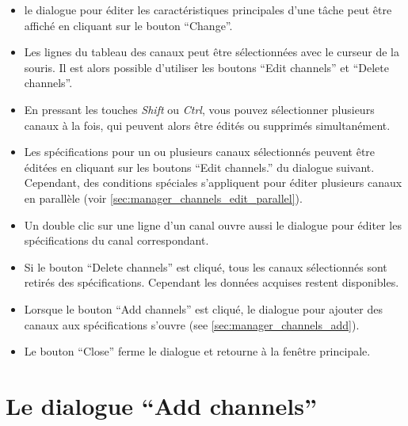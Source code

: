 \documentclass[a4paper,12pt,BCOR6mm,bibtotoc,idxtotoc]{scrbook}
\begin{document}
\begin{itemize}

\item le dialogue pour \'editer les caract\'eristiques principales d'une t\^ache
  peut \^etre affich\'e en cliquant sur le bouton ``Change''.

\item Les lignes du tableau des canaux peut \^etre s\'electionn\'ees
  avec le curseur de la souris. Il est alors possible d'utiliser les boutons
  ``Edit channels'' et ``Delete channels''.

\item En pressant les touches \textit{Shift} ou \textit{Ctrl}, vous
  pouvez s\'electionner plusieurs canaux \`a la fois, qui peuvent
  alors \^etre \'edit\'es ou supprim\'es simultan\'ement.

\item Les sp\'ecifications pour un ou plusieurs canaux
  s\'electionn\'es peuvent \^etre \'edit\'ees en cliquant sur les
  boutons ``Edit channels.''  du dialogue suivant.
  Cependant, des conditions sp\'eciales s'appliquent pour \'editer
  plusieurs canaux en parall\`ele (voir
  \autoref{sec:manager_channels_edit_parallel}).

\item Un double clic sur une ligne d'un canal ouvre aussi le
  dialogue pour \'editer les sp\'ecifications du canal
  correspondant.

\item Si le bouton ``Delete channels'' est cliqu\'e, tous les canaux
  s\'electionn\'es sont retir\'es des sp\'ecifications. Cependant les
  donn\'ees acquises restent disponibles.

\item Lorsque le bouton ``Add channels'' est cliqu\'e, le dialogue
  pour ajouter des canaux aux sp\'ecifications s'ouvre
 (see \autoref{sec:manager_channels_add}).

\item Le bouton ``Close'' ferme le dialogue et retourne
  \`a la fen\^etre principale.

\end{itemize}


\section{Le dialogue ``Add channels''}
\label{sec:manager_channels_add}
\end{document}
